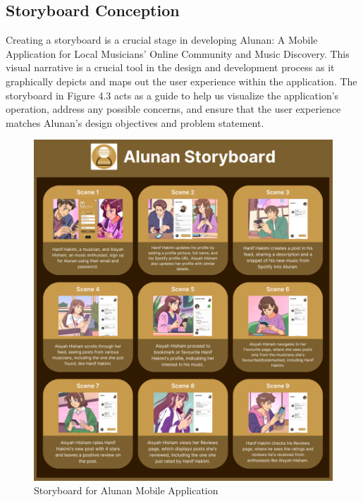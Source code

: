 \subsection{Storyboard Conception}
Creating a storyboard is a crucial stage in developing Alunan: A Mobile Application for Local Musicians’ Online Community and Music Discovery. This visual narrative is a crucial tool in the design and development process as it graphically depicts and maps out the user experience within the application. The storyboard in Figure 4.3 acts as a guide to help us visualize the application's operation, address any possible concerns, and ensure that the user experience matches Alunan's design objectives and problem statement.

\begin{figure}[h]
    \centering
    \includegraphics[width=1.0\linewidth]{mainmatter/images/storyboard.png}
	\caption{Storyboard for Alunan Mobile Application}
    \label{fig:myfig42}
\end{figure}
\pagebreak

